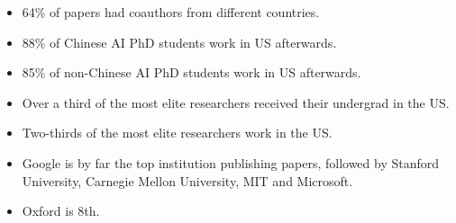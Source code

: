 \begin{itemize}
    \begin{itemize}
        \item 64\% of papers had coauthors from different countries.
        \item 88\% of Chinese AI PhD students work in US afterwards.
        \item 85\% of non-Chinese AI PhD students work in US afterwards.
        \item Over a third of the most elite researchers received their undergrad in the US.
        \item Two-thirds of the most elite researchers work in the US.
        \item Google is by far the top institution publishing papers, followed by Stanford University, Carnegie Mellon University, MIT and Microsoft.
        \item Oxford is 8th.
    \end{itemize}
\end{itemize}